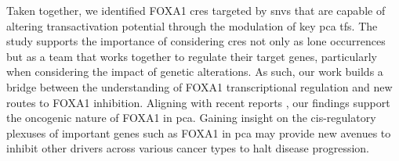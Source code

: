 Taken together, we identified FOXA1 \glspl{cre} targeted by \glspl{snv} that are capable of altering transactivation potential through the modulation of key \gls{pca} \glspl{tf}.
The study supports the importance of considering \glspl{cre} not only as lone occurrences but as a team that works together to regulate their target genes, particularly when considering the impact of genetic alterations.
As such, our work builds a bridge between the understanding of FOXA1 transcriptional regulation and new routes to FOXA1 inhibition.
Aligning with recent reports \cite{paroliaDistinctStructuralClasses2019,adamsFOXA1MutationsAlter2019,gaoForkheadDomainMutations2019}, our findings support the oncogenic nature of FOXA1 in \gls{pca}.
Gaining insight on the cis-regulatory plexuses of important genes such as FOXA1 in \gls{pca} may provide new avenues to inhibit other drivers across various cancer types to halt disease progression.
